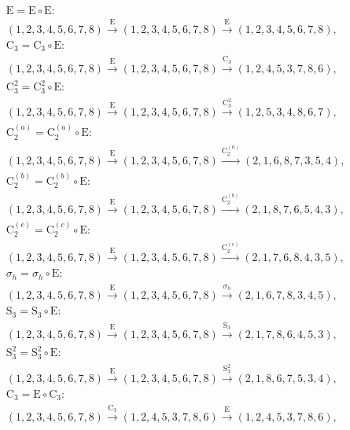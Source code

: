 \begin{align*}
& \mathrm{E} = \mathrm{E} \circ \mathrm{E}:\; \\& (1,2,3,4,5,6,7,8) \xrightarrow{\mathrm{E}} (1,2,3,4,5,6,7,8) \xrightarrow{\mathrm{E}} (1,2,3,4,5,6,7,8), \\
& \mathrm{C}_{3} = \mathrm{C}_{3} \circ \mathrm{E}:\; \\& (1,2,3,4,5,6,7,8) \xrightarrow{\mathrm{E}} (1,2,3,4,5,6,7,8) \xrightarrow{\mathrm{C}_{3}} (1,2,4,5,3,7,8,6), \\
& \mathrm{C}_{3}^{2} = \mathrm{C}_{3}^{2} \circ \mathrm{E}:\; \\& (1,2,3,4,5,6,7,8) \xrightarrow{\mathrm{E}} (1,2,3,4,5,6,7,8) \xrightarrow{\mathrm{C}_{3}^{2}} (1,2,5,3,4,8,6,7), \\
& \mathrm{C}_{2}^{(a)} = \mathrm{C}_{2}^{(a)} \circ \mathrm{E}:\; \\& (1,2,3,4,5,6,7,8) \xrightarrow{\mathrm{E}} (1,2,3,4,5,6,7,8) \xrightarrow{\mathrm{C}_{2}^{(a)}} (2,1,6,8,7,3,5,4), \\
& \mathrm{C}_{2}^{(b)} = \mathrm{C}_{2}^{(b)} \circ \mathrm{E}:\; \\& (1,2,3,4,5,6,7,8) \xrightarrow{\mathrm{E}} (1,2,3,4,5,6,7,8) \xrightarrow{\mathrm{C}_{2}^{(b)}} (2,1,8,7,6,5,4,3), \\
& \mathrm{C}_{2}^{(c)} = \mathrm{C}_{2}^{(c)} \circ \mathrm{E}:\; \\& (1,2,3,4,5,6,7,8) \xrightarrow{\mathrm{E}} (1,2,3,4,5,6,7,8) \xrightarrow{\mathrm{C}_{2}^{(c)}} (2,1,7,6,8,4,3,5), \\
& \sigma_{h} = \sigma_{h} \circ \mathrm{E}:\; \\& (1,2,3,4,5,6,7,8) \xrightarrow{\mathrm{E}} (1,2,3,4,5,6,7,8) \xrightarrow{\sigma_{h}} (2,1,6,7,8,3,4,5), \\
& \mathrm{S}_{3} = \mathrm{S}_{3} \circ \mathrm{E}:\; \\& (1,2,3,4,5,6,7,8) \xrightarrow{\mathrm{E}} (1,2,3,4,5,6,7,8) \xrightarrow{\mathrm{S}_{3}} (2,1,7,8,6,4,5,3), \\
& \mathrm{S}_{3}^{2} = \mathrm{S}_{3}^{2} \circ \mathrm{E}:\; \\& (1,2,3,4,5,6,7,8) \xrightarrow{\mathrm{E}} (1,2,3,4,5,6,7,8) \xrightarrow{\mathrm{S}_{3}^{2}} (2,1,8,6,7,5,3,4), \\
& \mathrm{C}_{3} = \mathrm{E} \circ \mathrm{C}_{3}:\; \\& (1,2,3,4,5,6,7,8) \xrightarrow{\mathrm{C}_{3}} (1,2,4,5,3,7,8,6) \xrightarrow{\mathrm{E}} (1,2,4,5,3,7,8,6), \\

\end{align*}
